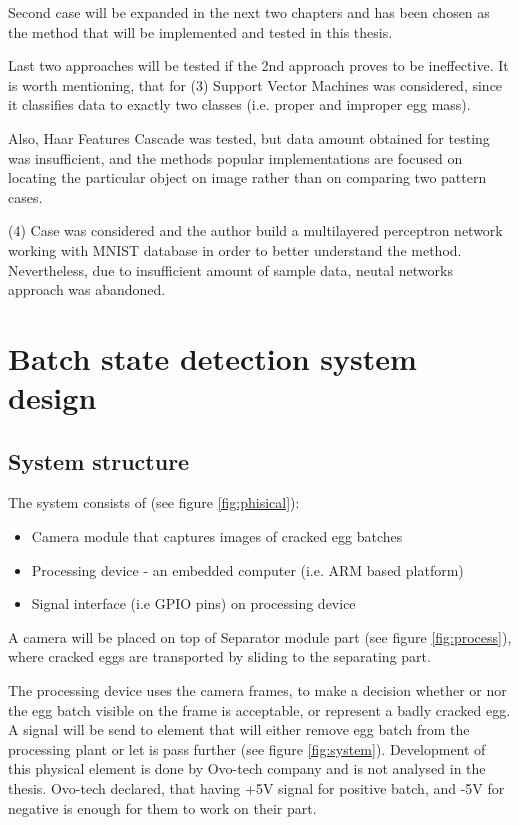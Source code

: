 \documentclass[12pt,twoside,a4paper]{article}
\begin{document}
Second case will be expanded in the next two chapters and has been chosen as the method that will be implemented and tested in this thesis.

Last two approaches will be tested if the 2nd approach proves to be ineffective.
It is worth mentioning, that for (3) Support Vector Machines was considered, since it classifies data to exactly two classes (i.e. proper and improper egg mass).

Also, Haar Features Cascade was tested, but data amount obtained for testing was insufficient, and the methods popular implementations are focused on locating the particular object on image rather than on comparing two pattern cases.

(4) Case was considered and the author build a multilayered perceptron network working with MNIST database in order to better understand the method.
Nevertheless, due to insufficient amount of sample data, neutal networks approach was abandoned.


\section{Batch state detection system design}

\subsection{System structure}
The system consists of (see figure \ref{fig:phisical}):
\begin{itemize}
\item Camera module that captures images of cracked egg batches
\item Processing device - an embedded computer (i.e. ARM based platform)
\item Signal interface (i.e GPIO pins) on processing device
\end{itemize}

A camera will be placed on top of Separator module part (see figure \ref{fig:process}), where cracked eggs are transported by sliding to the separating part.

The processing device uses the camera frames, to make a decision whether or nor the egg batch visible on the frame is acceptable, or represent a badly cracked egg.
A signal will be send to element that will either remove egg batch from the processing plant or let is pass further (see figure \ref{fig:system}).
Development of this physical element is done by Ovo-tech company and is not analysed in the thesis. Ovo-tech declared, that having +5V signal for positive batch, and -5V for negative is enough for them to work on their part.
\end{document}
